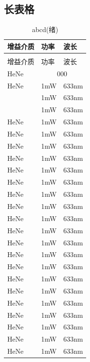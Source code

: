\documentclass[withoutpreface,bwprint]{cumcmthesis} %
\begin{document}
\begin{appendices}
\section{长表格}
\begin{longtable}[c]{p{}<{\centering}|p{}<{\centering}p{}<{\centering}}
    \caption{abcd} \\
    \toprule[2pt]
    增益介质&功率& 波长\\ 
    \midrule[1pt]
    \endfirsthead
    \caption[]{abcd(绪)} \\
    \toprule[2pt]
    增益介质&功率&波长\\ 
    \midrule[1pt]
    \endhead
    \bottomrule[1.5pt] 
    \endfoot
    \bottomrule[1.5pt]
    \endlastfoot
    HeNe & \multicolumn{2}{c}{000} \\
    HeNe & 1mW & 633nm \\\cline{1-2} 
    \multirow{2}{0.2\textwidth}{\centering000}
     & 1mW & 633nm \\
     & 1mW & 633nm \\
    HeNe & 1mW & 633nm \\
    HeNe & 1mW & 633nm \\
    HeNe & 1mW &  633nm \\
    HeNe & 1mW & 633nm \\
    HeNe & 1mW & 633nm \\
    HeNe & 1mW & 633nm \\
    HeNe & 1mW & 633nm \\
    HeNe & 1mW & 633nm \\
    HeNe & 1mW & 633nm \\
    HeNe & 1mW & 633nm \\
    HeNe & 1mW & 633nm \\
    HeNe & 1mW & 633nm \\
    HeNe & 1mW & 633nm \\
    HeNe & 1mW & 633nm \\
    HeNe & 1mW & 633nm \\
    HeNe & 1mW & 633nm \\
    HeNe & 1mW & 633nm \\
    HeNe & 1mW & 633nm \\
    HeNe & 1mW & 633nm \\
    HeNe & 1mW & 633nm \\

\end{longtable}
\end{appendices}
\end{document}
